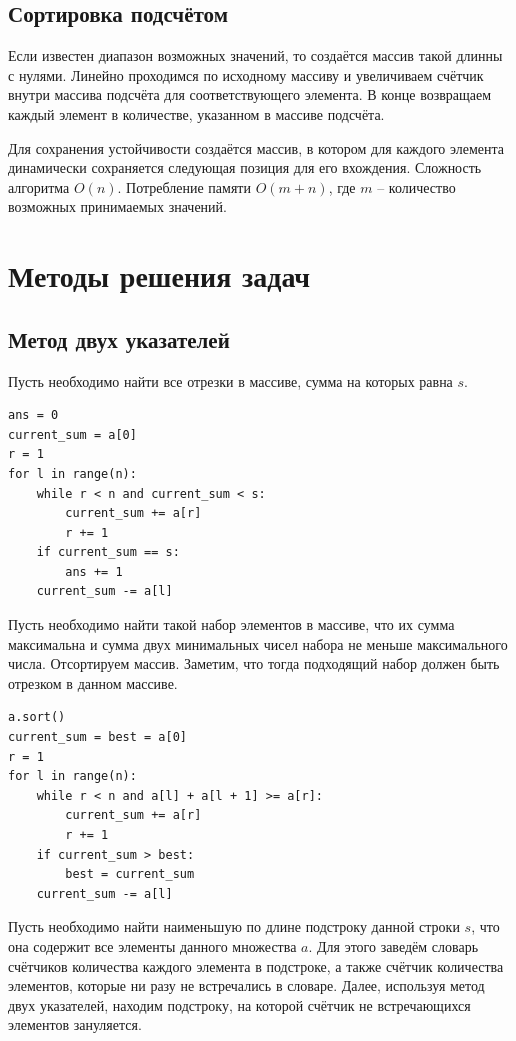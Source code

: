 \documentclass[12pt]{article}
\begin{document}
\subsection{Сортировка подсчётом}

\begin{algorithm}
	Если известен диапазон возможных значений, то создаётся массив такой
	длинны с нулями. Линейно проходимся по исходному массиву и
	увеличиваем счётчик внутри массива подсчёта для соответствующего
	элемента. В конце возвращаем каждый элемент в количестве, указанном
	в массиве подсчёта.\par

	Для сохранения устойчивости создаётся массив, в котором для каждого
	элемента динамически сохраняется следующая позиция для его
	вхождения. Сложность алгоритма $O(n)$. Потребление памяти $O(m+n)$,
	где $m$ -- количество возможных принимаемых значений.
\end{algorithm}

\section{Методы решения задач}

\subsection{Метод двух указателей}

\begin{algorithm}
	Пусть необходимо найти все отрезки в массиве, сумма на которых равна
	$s$.
	\begin{verbatim}
ans = 0
current_sum = a[0]
r = 1
for l in range(n):
	while r < n and current_sum < s:
		current_sum += a[r]
		r += 1
	if current_sum == s:
		ans += 1
	current_sum -= a[l]
	\end{verbatim}
\end{algorithm}
\begin{algorithm}
	Пусть необходимо найти такой набор элементов в массиве, что их сумма
	максимальна и сумма двух минимальных чисел набора не меньше
	максимального числа. Отсортируем массив. Заметим, что тогда
	подходящий набор должен быть отрезком в данном массиве.
	\begin{verbatim}
a.sort()
current_sum = best = a[0]
r = 1
for l in range(n):
	while r < n and a[l] + a[l + 1] >= a[r]:
		current_sum += a[r]
		r += 1
	if current_sum > best:
		best = current_sum
	current_sum -= a[l]
	\end{verbatim}
\end{algorithm}
\begin{algorithm}
	Пусть необходимо найти наименьшую по длине подстроку данной строки
	$s$, что она содержит все элементы данного множества $a$. Для этого
	заведём словарь счётчиков количества каждого элемента в подстроке, а
	также счётчик количества элементов, которые ни разу не встречались в
	словаре. Далее, используя метод двух указателей, находим подстроку,
	на которой счётчик не встречающихся элементов зануляется.
\end{algorithm}
\end{document}
